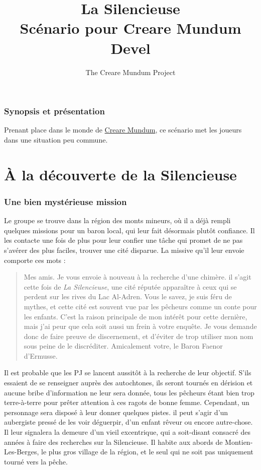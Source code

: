 \documentclass[a4paper, 11pt]{article}
\title{La Silencieuse \\ Scénario pour Creare Mundum \\ Devel}
\author{The Creare Mundum Project}
\date{\oldstylenums{\insertdate}}
\begin{document}
\maketitle
\setcounter{tocdepth}{1} %
\renewcommand{\contentsname}{Sommaire} 
\tableofcontents
\newpage
\section{Synopsis et présentation}
Prenant place dans le monde de {\hyperlink {participation} {Creare Mundum}}, ce scénario met les joueurs dans une situation peu commune. 
\part{À la découverte de la Silencieuse}
\section{Une bien mystérieuse mission}
Le groupe se trouve dans la région des monts mineurs, où il a déjà rempli quelques missions pour un baron local, qui leur fait désormais plutôt confiance. Il les contacte une fois de plus pour leur confier une tâche qui promet de ne pas s'avérer des plus faciles, trouver une cité disparue. La missive qu'il leur envoie comporte ces mots :
\newline
\begin{quotation}
Mes amis. 
\newline
Je vous envoie à nouveau à la recherche d'une chimère. il s'agit cette fois de \textit{La Silencieuse}, une cité réputée apparaître à ceux qui se perdent sur les rives du Lac Al-Adren. Vous le savez, je suis féru de mythes, et cette cité est souvent vue par les pêcheurs comme un conte pour les enfants. C'est la raison principale de mon intérêt pour cette dernière, mais j'ai peur que cela soit aussi un frein à votre enquête. Je vous demande donc de faire preuve de discernement, et d'éviter de trop utiliser mon nom sous peine de le discréditer.
\newline
Amicalement votre, le Baron Faenor d'Ermusse.
\end{quotation}
Il est probable que les PJ se lancent aussitôt à la recherche de leur objectif. S'ils essaient de se renseigner auprès des autochtones, ils seront tournés en dérision et aucune bribe d'information ne leur sera donnée, tous les pêcheurs étant bien trop terre-à-terre pour prêter attention à ces ragots de bonne femme. Cependant, un personnage sera disposé à leur donner quelques pistes. il peut s'agir d'un aubergiste pressé de les voir déguerpir, d'un enfant rêveur ou encore autre-chose. Il leur signalera la demeure d'un vieil excentrique, qui a soit-disant consacré des années à faire des recherches sur la Silencieuse. Il habite aux abords de Montien-Les-Berges, le plus gros village de la région, et le seul qui ne soit pas uniquement tourné vers la pêche. 
\end{document}
